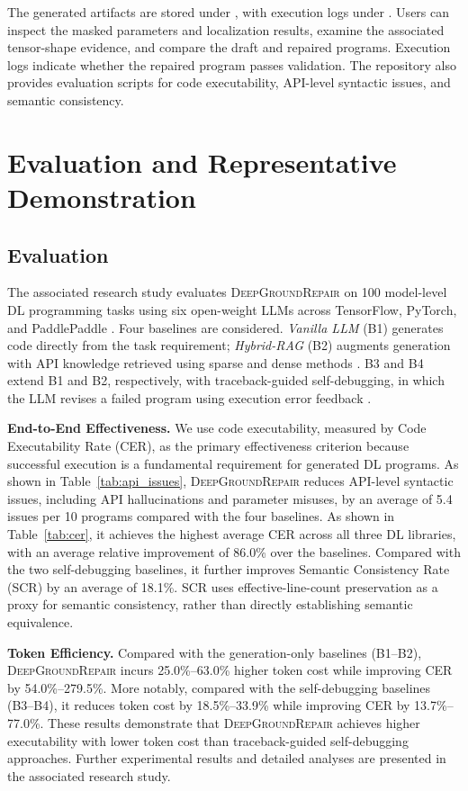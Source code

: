\documentclass[10pt,conference]{IEEEtran}
\begin{document}
The generated artifacts are stored under , with execution logs under . Users can inspect the masked parameters and localization results, examine the associated tensor-shape evidence, and compare the draft and repaired programs. Execution logs indicate whether the repaired program passes validation. The repository also provides
evaluation scripts for code executability, API-level syntactic issues, and semantic consistency.


\section{Evaluation and Representative Demonstration}
\subsection{Evaluation}
The associated research study evaluates \textsc{DeepGroundRepair} on 100 model-level DL programming tasks using six open-weight LLMs across TensorFlow, PyTorch, and PaddlePaddle \cite{deepgroundrepair}. Four baselines are considered. \textit{Vanilla LLM} (B1) generates code directly from the task requirement; \textit{Hybrid-RAG} (B2) augments generation with API knowledge retrieved using sparse and dense methods \cite{luan2021retrieval}. B3 and B4 extend B1 and B2, respectively, with traceback-guided self-debugging, in which the LLM revises a failed program using execution error feedback \cite{selfrepair}.




\noindent\textbf{End-to-End Effectiveness.}
We use code executability, measured by Code Executability Rate (CER), as the primary effectiveness criterion because successful execution is a fundamental requirement for generated DL programs. As shown in Table~\ref{tab:api_issues}, \textsc{DeepGroundRepair} reduces API-level syntactic issues, including API hallucinations and parameter misuses, by an average of 5.4 issues per 10 programs compared with the four baselines. As shown in Table~\ref{tab:cer}, it achieves the highest average CER across all three DL libraries, with an average relative improvement of 86.0\% over the baselines. Compared with the two self-debugging baselines, it further
improves Semantic Consistency Rate (SCR) by an average of 18.1\%. SCR uses effective-line-count preservation as a proxy for semantic consistency, rather than directly establishing semantic equivalence.

\noindent\textbf{Token Efficiency.}
Compared with the generation-only baselines (B1--B2), \textsc{DeepGroundRepair} incurs 25.0\%--63.0\% higher token cost while improving CER by 54.0\%--279.5\%. More notably, compared with the self-debugging baselines (B3--B4), it reduces token cost by 18.5\%--33.9\% while improving CER by 13.7\%--77.0\%. These results demonstrate that \textsc{DeepGroundRepair} achieves higher executability with lower token cost than traceback-guided self-debugging approaches. Further experimental results and detailed analyses are presented in the associated research study\cite{deepgroundrepair}.
\end{document}
